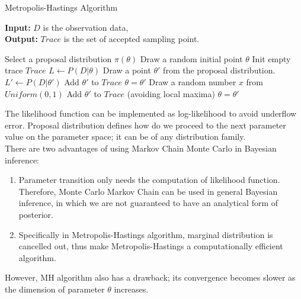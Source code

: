 \documentclass[12pt]{article}
\theoremstyle{definition}
\begin{document}
\begin{algorithm}[H]
  \caption{Metropolis-Hastings Algorithm}\label{mhalg}
  \hspace*{\algorithmicindent} \textbf{Input:} $D$ is the observation data, \\
  \hspace*{\algorithmicindent} \textbf{Output:} $Trace$ is the set of accepted
    sampling point.
  \begin{algorithmic}[1]
    \State Select a proposal distribution $\pi(\theta)$
    \State Draw a random initial point $\theta$
    \State Init empty trace $Trace$
    \State $L \leftarrow P(D|\theta)$
    \State Draw a point $\theta' $ from the proposal distribution.
    \State $L' \leftarrow P(D|\theta')$
    \State Add $\theta'$ to $Trace$
    \State $\theta = \theta'$
    \Else
    \State Draw a random number $x$ from $Uniform(0,1)$
    \State Add $\theta'$ to $Trace$ (avoiding local maxima)
    \State $\theta = \theta'$
    \EndIf
    \EndIf
    \EndWhile
    \EndProcedure
  \end{algorithmic}
\end{algorithm}
The likelihood function can be implemented as log-likelihood to avoid underflow
error. Proposal distribution defines how do we proceed to the next parameter
value on the parameter space; it can be of any distribution family.\\
There are two advantages of using Markov Chain Monte Carlo in Bayesian inference:
\begin{enumerate}
\item Parameter transition only needs the computation of likelihood function.
  Therefore, Monte Carlo Markov Chain can be used in general Bayesian inference,
  in which we are not guaranteed to have an analytical form of posterior.
\item Specifically in Metropolis-Hastings algorithm, marginal distribution is
  cancelled out, thus make Metropolis-Hastings a computationally efficient algorithm.
\end{enumerate}
However, MH algorithm also has a drawback; its convergence becomes slower as the
dimension of parameter $\theta$ increases.
\end{document}
